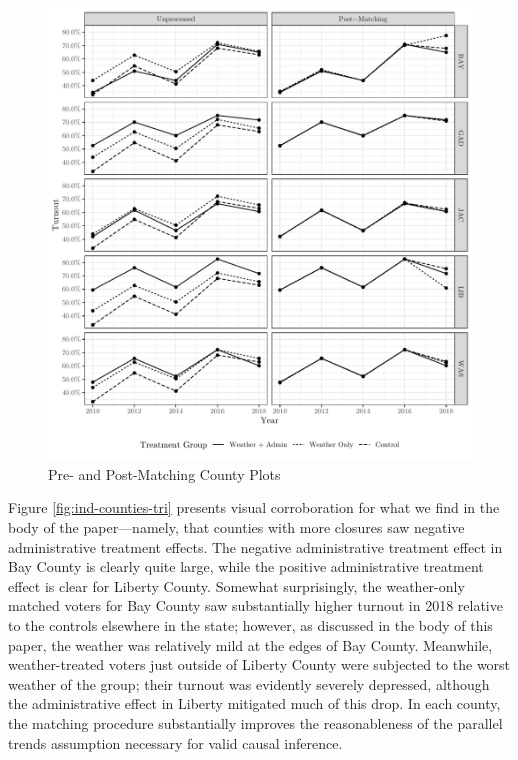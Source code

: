 \documentclass[
  12pt,
]{article}
\begin{document}
\begin{figure}[H]

{\centering \includegraphics{si_files/figure-latex/indcs-chunk-tr-1} 

}

\caption{\label{fig:ind-counties-tri}Pre- and Post-Matching County Plots}\label{fig:indcs-chunk-tr}
\end{figure}

Figure \ref{fig:ind-counties-tri} presents visual corroboration for what we find in the body of the paper---namely, that counties with more closures saw negative administrative treatment effects. The negative administrative treatment effect in Bay County is clearly quite large, while the positive administrative treatment effect is clear for Liberty County. Somewhat surprisingly, the weather-only matched voters for Bay County saw substantially higher turnout in 2018 relative to the controls elsewhere in the state; however, as discussed in the body of this paper, the weather was relatively mild at the edges of Bay County. Meanwhile, weather-treated voters just outside of Liberty County were subjected to the worst weather of the group; their turnout was evidently severely depressed, although the administrative effect in Liberty mitigated much of this drop. In each county, the matching procedure substantially improves the reasonableness of the parallel trends assumption necessary for valid causal inference.
\end{document}
